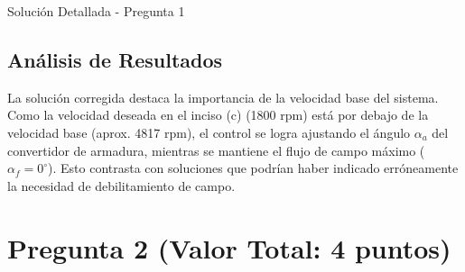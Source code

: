 \documentclass[12pt]{article}
\begin{document}
\begin{solutionbox}{Solución Detallada - Pregunta 1}
\subsection*{Análisis de Resultados}
La solución corregida destaca la importancia de la velocidad base del sistema. Como la velocidad deseada en el inciso (c) (1800 rpm) está por debajo de la velocidad base (aprox. 4817 rpm), el control se logra ajustando el ángulo $\alpha_a$ del convertidor de armadura, mientras se mantiene el flujo de campo máximo ($\alpha_f = 0^{\circ}$). Esto contrasta con soluciones que podrían haber indicado erróneamente la necesidad de debilitamiento de campo.

\end{solutionbox}

\newpage
\section{Pregunta 2 (Valor Total: 4 puntos)}
\end{document}
